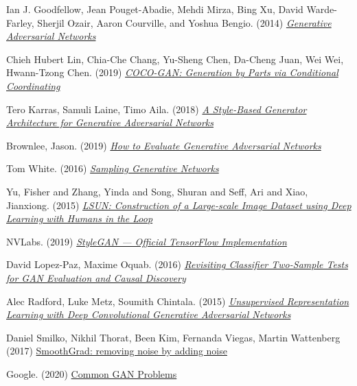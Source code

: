 \documentclass{article}
\begin{document}
\newpage
\begin{thebibliography}{9}
        Ian J. Goodfellow, Jean Pouget-Abadie, Mehdi Mirza, Bing Xu, David Warde-Farley, Sherjil Ozair, Aaron Courville, and Yoshua Bengio. (2014)
        \href{https://papers.nips.cc/paper/2014/file/5ca3e9b122f61f8f06494c97b1afccf3-Paper.pdf}{\textit{Generative Adversarial Networks} }

        Chieh Hubert Lin, Chia-Che Chang, Yu-Sheng Chen, Da-Cheng Juan, Wei Wei, Hwann-Tzong Chen. (2019)
        \href{https://arxiv.org/pdf/1904.00284.pdf}{\textit{COCO-GAN: Generation by Parts via Conditional Coordinating} }

        Tero Karras, Samuli Laine, Timo Aila. (2018)
        \href{https://arxiv.org/pdf/1812.04948.pdf}{\textit{A Style-Based Generator Architecture for Generative Adversarial Networks} }

        Brownlee, Jason. (2019)
        \href{https://machinelearningmastery.com/how-to-evaluate-generative-adversarial-networks/}{\textit{How to Evaluate Generative Adversarial Networks}}

        Tom White. (2016)
        \href{https://arxiv.org/pdf/1609.04468.pdf}{\textit{Sampling Generative Networks} }

        Yu, Fisher and Zhang, Yinda and Song, Shuran and Seff, Ari and Xiao, Jianxiong. (2015)
        \href{https://arxiv.org/pdf/1506.03365.pdf}{\textit{LSUN: Construction of a Large-scale Image Dataset using Deep Learning with Humans in the Loop}}

        NVLabs. (2019) \href{https://github.com/NVlabs/stylegan}{\textit{StyleGAN — Official TensorFlow Implementation}}

        David Lopez-Paz, Maxime Oquab. (2016)
        \href{https://research.fb.com/wp-content/uploads/2017/04/neural_tests.pdf?}{\textit{Revisiting Classifier Two-Sample Tests for GAN Evaluation and Causal Discovery}}

        Alec Radford, Luke Metz, Soumith Chintala. (2015)
        \href{https://arxiv.org/pdf/1511.06434.pdf}{\textit{Unsupervised Representation Learning with Deep Convolutional Generative Adversarial Networks}}

        Daniel Smilko, Nikhil Thorat, Been Kim, Fernanda Viegas, Martin Wattenberg (2017)
        \href{https://arxiv.org/pdf/1706.03825.pdf}{SmoothGrad: removing noise by adding noise}
        
        Google. (2020)
        \href{https://developers.google.com/machine-learning/gan/problems}{Common GAN Problems}

    \end{thebibliography}
    
\end{document}
